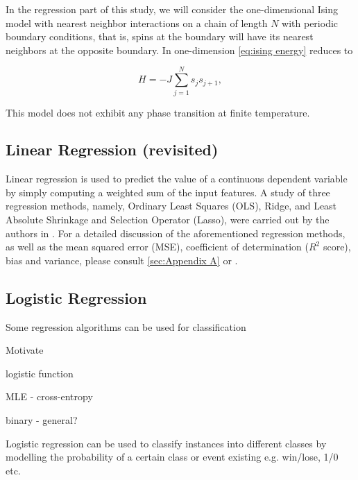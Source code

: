In the regression part of this study, we will consider the one-dimensional Ising model with nearest neighbor interactions on a chain of length $N$ with periodic boundary conditions, that is, spins at the boundary will have its nearest neighbors at the opposite boundary. In one-dimension \autoref{eq:ising energy} reduces to 

\begin{equation}\label{eq:ising 1D energy}
    H  = - J \sum_{j=1}^N s_j s_{j+1},
\end{equation}

This model does not exhibit any phase transition at finite temperature.



\subsection{Linear Regression (revisited)}\label{sec:linreg theory}
Linear regression is used to predict the value of a continuous dependent variable by simply computing a weighted sum of the input features. A study of three regression methods, namely, Ordinary Least Squares (OLS), Ridge, and Least Absolute Shrinkage and Selection Operator (Lasso), were carried out by the authors in \cite{PROJone}. For a detailed discussion of the aforementioned regression methods, as well as the mean squared error (MSE), coefficient of determination ($R^2$ score), bias and variance, please consult \autoref{sec:Appendix A} or \cite{PROJone}.

\subsection{Logistic Regression}\label{sec:logreg theory}
Some regression algorithms can be used for classification




Motivate

logistic function

MLE - cross-entropy

binary - general?

Logistic regression can be used to classify instances into different classes by modelling the probability of a certain class or event existing e.g. win/lose, 1/0 etc. 

